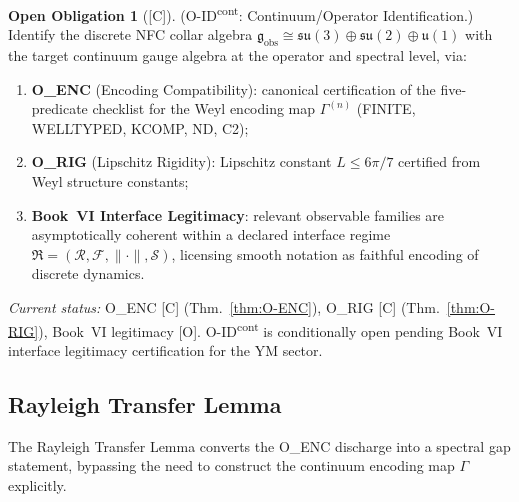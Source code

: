 \documentclass[12pt,oneside]{amsbook}
\theoremstyle{plain}
\theoremstyle{definition}
\newtheorem{obligation}[theorem]{Open Obligation}
\theoremstyle{remark}
\newcommand{\status}[1]{\textup{[#1]}}
\begin{document}
\begin{obligation}[\status{C}]\label{ob:O-ID-cont}
\textup{(O-ID\textsuperscript{cont}: Continuum/Operator Identification.)}
Identify the discrete NFC collar algebra
$\mathfrak{g}_{\mathrm{obs}} \cong
\mathfrak{su}(3)\oplus\mathfrak{su}(2)\oplus\mathfrak{u}(1)$
with the target continuum gauge algebra at the operator and
spectral level, via:
\begin{enumerate}[label=\textup{(\arabic*)}]
 \item \textbf{O\_ENC} (Encoding Compatibility): canonical
 certification of the five-predicate checklist for the Weyl
 encoding map $\Gamma^{(n)}$ (FINITE, WELLTYPED, KCOMP, ND, C2);
 \item \textbf{O\_RIG} (Lipschitz Rigidity): Lipschitz constant
 $L \leq 6\pi/7$ certified from Weyl structure constants;
 \item \textbf{Book~VI Interface Legitimacy}: relevant observable
 families are asymptotically coherent within a declared interface
 regime $\mathfrak{R} = (\mathcal{R}, \mathcal{F}, \|\cdot\|,
 \mathcal{S})$, licensing smooth notation as faithful encoding
 of discrete dynamics.
\end{enumerate}
\emph{Current status:} O\_ENC [C] (Thm.~\ref{thm:O-ENC}),
O\_RIG [C] (Thm.~\ref{thm:O-RIG}), Book~VI legitimacy [O].
O-ID\textsuperscript{cont} is conditionally open pending
Book~VI interface legitimacy certification for the YM sector.
\end{obligation}

\subsection{Rayleigh Transfer Lemma}

The Rayleigh Transfer Lemma converts the O\_ENC discharge into
a spectral gap statement, bypassing the need to construct the
continuum encoding map $\Gamma$ explicitly.
\end{document}
